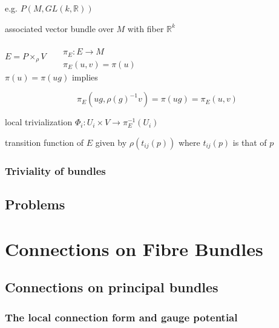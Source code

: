 \documentclass{book}
\begin{document}
e.g. $P(M,GL(k, \mathbb{R}))$

associated vector bundle over $M$ with fiber $\mathbb{R}^k$

$E = P \times_{\rho} V$ \quad \, $\begin{aligned}
  & \quad \\
  & \pi_E : E \to M \\
  & \pi_E(u,v) = \pi(u) 
\end{aligned}$ \\

$\pi(u) = \pi(ug)$ implies 

\[
\pi_E(ug, \rho(g)^{-1}v) = \pi(ug) = \pi_E(u,v)
\]

local trivialization $\Phi_i : U_i \times V \to \pi^{-1}_E(U_i)$


transition function of $E$ given by $\rho(t_{ij}(p))$ where $t_{ij}(p)$ is that of $p$




\subsection{ Triviality of bundles }


\section*{ Problems }




\chapter{Connections on Fibre Bundles}

\section{Connections on principal bundles }



\subsection{}

\subsection{}

\subsection{ The local connection form and gauge potential }
\end{document}
